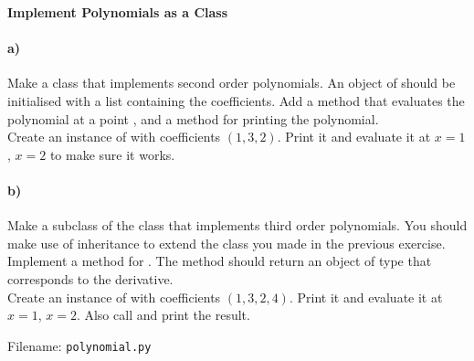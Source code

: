 \newpage
\begin{Problem}{\textbf{Implement Polynomials as a Class}} \label{prob92}

\paragraph{a)}
Make a class  that implements second order polynomials. An
object of  should be initialised with a list containing the
coefficients. Add a  method that evaluates the
polynomial at a point , and a  method
for printing the polynomial.
\\
Create an instance of  with coefficients $(1, 3, 2)$. Print it and
evaluate it at $x=1$, $x=2$ to make sure it works.

\paragraph{b)}
Make a subclass  of the class  that implements third order
polynomials. You should make use of inheritance to extend the class
 you made in the previous exercise. Implement a method
 for . The method should return an object
of type  that corresponds to the derivative.
\\
Create an instance of  with coefficients $(1, 3, 2, 4)$. Print it
and evaluate it at $x=1$, $x=2$. Also call  and print the result.

Filename: \texttt{polynomial.py}
\end{Problem}

